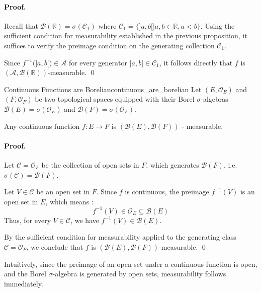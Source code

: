 \paragraph{Proof.}
Recall that $\mathcal{B}(\mathbb{R}) = \sigma(\mathcal{C}_1)$ where $\mathcal{C}_1 = \{ ]a, b[ \mid a, b \in \mathbb{R}, a < b \}$.
Using the sufficient condition for measurability established in the previous proposition, it suffices to verify the preimage condition on the generating collection $\mathcal{C}_1$.

Since $f^{-1}\big(]a, b[\big) \in \mathcal{A}$ for every generator $]a, b[ \in \mathcal{C}_1$, it follows directly that $f$ is $(\mathcal{A}, \mathcal{B}(\mathbb{R}))$-measurable. \qed

\vspace{1.2em}


\begin{example}{Continuous Functions are Borelian}{continuous_are_borelian}
Let $(E, \mathcal{O}_E)$ and $(F, \mathcal{O}_F)$ be two topological spaces equipped with their Borel $\sigma$-algebras $\mathcal{B}(E) = \sigma(\mathcal{O}_E)$ and $\mathcal{B}(F) = \sigma(\mathcal{O}_F)$. 

Any continuous function $f : E \to F$ is $(\mathcal{B}(E), \mathcal{B}(F))$ - measurable.
\end{example}

\paragraph{Proof.}
Let $\mathcal{C} = \mathcal{O}_F$ be the collection of open sets in $F$, which generates $\mathcal{B}(F)$, i.e. $\sigma(\mathcal{C}) = \mathcal{B}(F)$.

Let $V \in \mathcal{C}$ be an open set in $F$. Since $f$ is continuous, the preimage $f^{-1}(V)$ is an open set in $E$, which means :
\[
    f^{-1}(V) \in \mathcal{O}_E \subseteq \mathcal{B}(E)
\]
Thus, for every $V \in \mathcal{C}$, we have $f^{-1}(V) \in \mathcal{B}(E)$.

By the sufficient condition for measurability applied to the generating class $\mathcal{C} = \mathcal{O}_F$, we conclude that $f$ is $(\mathcal{B}(E), \mathcal{B}(F))$-measurable. \qed


\begin{insight}[Intuition]
Intuitively, since the preimage of an open set under a continuous function is open, and the Borel $\sigma$-algebra is generated by open sets, measurability follows immediately.
\end{insight}

